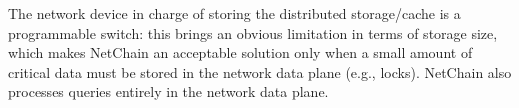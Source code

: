 The network device in charge of storing the distributed storage/cache is a programmable switch: this brings an obvious limitation in terms of storage size, which makes NetChain \cite{netchain} an acceptable solution only when a small amount of critical data must be stored in the network data plane (e.g., locks). NetChain \cite{netchain} also processes queries entirely in the network data plane.